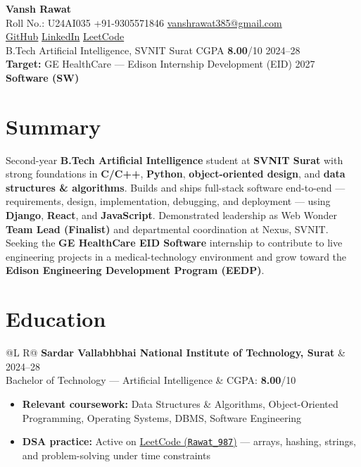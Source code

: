 \documentclass[a4paper,10pt]{article}
\makeatletter
\newcommand{\entry}[4]{%
  \vspace{0.6mm}
  \noindent\begin{tabularx}{\textwidth}{@{}L R@{}}
    \textbf{#1} & {\small #2} \\
    {\small #3} & {\small #4} \\
  \end{tabularx}\par
}
\makeatother
\begin{document}
\selectfont

\begin{center}
  {\LARGE \textbf{Vansh Rawat}} \\[1.2mm]
  \small
  Roll No.: U24AI035 \textbar{}
  +91-9305571846 \textbar{}
  \href{mailto:vanshrawat385@gmail.com}{vanshrawat385@gmail.com} \\[0.4mm]
  \href{https://github.com/Vansh-ai406/}{GitHub} \textbar{}
  \href{https://www.linkedin.com/in/vansh-rawat-020612337/}{LinkedIn} \textbar{}
  \href{https://leetcode.com/u/Rawat_987/}{LeetCode} \\[0.4mm]
  B.Tech Artificial Intelligence, SVNIT Surat \textbar{} CGPA \textbf{8.00}/10 \textbar{} 2024--28 \\[0.3mm]
  \textbf{Target:} GE HealthCare --- Edison Internship Development (EID) 2027 \textbar{} \textbf{Software (SW)}
\end{center}

\section{Summary}
\noindent\small
Second-year \textbf{B.Tech Artificial Intelligence} student at \textbf{SVNIT Surat} with strong foundations in \textbf{C/C++}, \textbf{Python}, \textbf{object-oriented design}, and \textbf{data structures \& algorithms}.
Builds and ships full-stack software end-to-end --- requirements, design, implementation, debugging, and deployment --- using \textbf{Django}, \textbf{React}, and \textbf{JavaScript}.
Demonstrated leadership as Web Wonder \textbf{Team Lead (Finalist)} and departmental coordination at Nexus, SVNIT.
Seeking the \textbf{GE HealthCare EID Software} internship to contribute to live engineering projects in a medical-technology environment and grow toward the \textbf{Edison Engineering Development Program (EEDP)}.

\section{Education}
\entry{Sardar Vallabhbhai National Institute of Technology, Surat}{2024--28}
{Bachelor of Technology --- Artificial Intelligence}{CGPA: \textbf{8.00}/10}
\begin{itemize}
  \item \textbf{Relevant coursework:} Data Structures \& Algorithms, Object-Oriented Programming, Operating Systems, DBMS, Software Engineering
  \item \textbf{DSA practice:} Active on \href{https://leetcode.com/u/Rawat_987/}{LeetCode (\texttt{Rawat\_987})} --- arrays, hashing, strings, and problem-solving under time constraints
\end{itemize}
\end{document}
